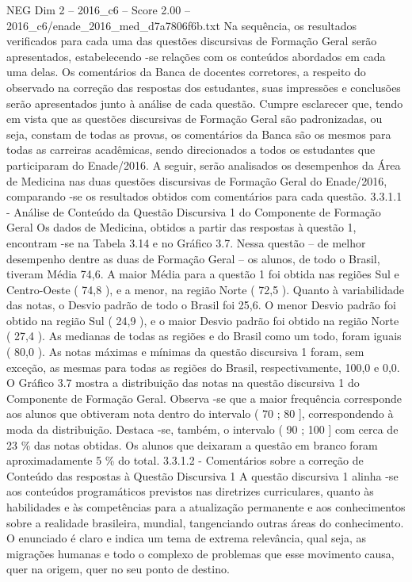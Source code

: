 \begin{textsample}{NEG Dim 2 – 2016\_c6 – Score 2.00 – 2016\_c6/enade\_2016\_med\_d7a7806f6b.txt}
Na sequência, os resultados verificados para cada uma das questões discursivas de Formação Geral serão apresentados, estabelecendo -se relações com os conteúdos abordados em cada uma delas.
Os comentários da Banca de docentes corretores, a respeito do observado na correção das respostas dos estudantes, suas impressões e conclusões serão apresentados junto à análise de cada questão.
Cumpre esclarecer que, tendo em vista que as questões discursivas de Formação Geral são padronizadas, ou seja, constam de todas as provas, os comentários da Banca são os mesmos para todas as carreiras acadêmicas, sendo direcionados a todos os estudantes que participaram do Enade/2016.
A seguir, serão analisados os desempenhos da Área de Medicina nas duas questões discursivas de Formação Geral do Enade/2016, comparando -se os resultados obtidos com comentários para cada questão. 3.3.1.1 - Análise de Conteúdo da Questão Discursiva 1 do Componente de Formação Geral Os dados de Medicina, obtidos a partir das respostas à questão 1, encontram -se na Tabela 3.14 e no Gráfico 3.7.
Nessa questão – de melhor desempenho dentre as duas de Formação Geral – os alunos, de todo o Brasil, tiveram Média 74,6.
A maior Média para a questão 1 foi obtida nas regiões Sul e Centro-Oeste ( 74,8 ), e a menor, na região Norte ( 72,5 ).
Quanto à variabilidade das notas, o Desvio padrão de todo o Brasil foi 25,6.
O menor Desvio padrão foi obtido na região Sul ( 24,9 ), e o maior Desvio padrão foi obtido na região Norte ( 27,4 ).
As medianas de todas as regiões e do Brasil como um todo, foram iguais ( 80,0 ).
As notas máximas e mínimas da questão discursiva 1 foram, sem exceção, as mesmas para todas as regiões do Brasil, respectivamente, 100,0 e 0,0.
O Gráfico 3.7 mostra a distribuição das notas na questão discursiva 1 do Componente de Formação Geral.
Observa -se que a maior frequência corresponde aos alunos que obtiveram nota dentro do intervalo ( 70 ; 80 ], correspondendo à moda da distribuição.
Destaca -se, também, o intervalo ( 90 ; 100 ] com cerca de 23 \% das notas obtidas.
Os alunos que deixaram a questão em branco foram aproximadamente 5 \% do total. 3.3.1.2 - Comentários sobre a correção de Conteúdo das respostas à Questão Discursiva 1 A questão discursiva 1 alinha -se aos conteúdos programáticos previstos nas diretrizes curriculares, quanto às habilidades e às competências para a atualização permanente e aos conhecimentos sobre a realidade brasileira, mundial, tangenciando outras áreas do conhecimento.
O enunciado é claro e indica um tema de extrema relevância, qual seja, as migrações humanas e todo o complexo de problemas que esse movimento causa, quer na origem, quer no seu ponto de destino.

\end{textsample}
